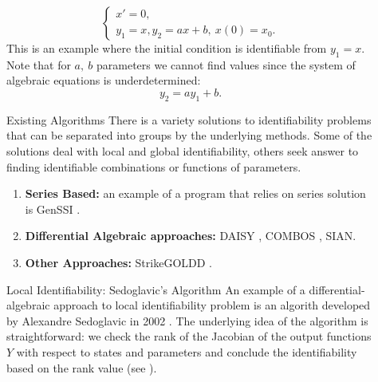 \documentclass[final]{beamer}
\newlength{\sepwidth}
\newlength{\colwidth}
\newcommand{\separatorcolumn}{\begin{column}{\sepwidth}\end{column}}
\begin{document}
\begin{frame}[t]
\begin{columns}[t]
\begin{column}{\colwidth}
    \end{column}

    \separatorcolumn

    \begin{column}{\colwidth}
      \begin{example}[3]
        \begin{equation}
          \begin{cases}
            x'=0, \\
            y_1=x, y_2=ax+b,~x(0)=x_0.
          \end{cases}
          \label{example3}
        \end{equation}
        This is an example where the initial condition is identifiable from \(y_1=x\). Note that for \(a,~b\) parameters we cannot find values since the system of algebraic equations is underdetermined: \[y_2=ay_1+b.\]
      \end{example}
      \begin{block}{Existing Algorithms}
        There is a variety solutions to identifiability problems that can be separated into groups by the underlying methods. Some of the solutions deal with local and global identifiability, others seek answer to finding identifiable combinations or functions of parameters.
        \begin{enumerate}
          \item \textbf{Series Based:} an example of a program that relies on series solution is GenSSI \cite{chics2011genssi}.
          \item \textbf{Differential Algebraic approaches:} DAISY \cite{saccomani2008daisy,saccomani2019new}, COMBOS \cite{meshkat2014finding,kalami2020combos2}, SIAN\cite{hong2019sian,hong2020global}.
          \item \textbf{Other Approaches:} StrikeGOLDD \cite{villaverde2016strikegoldd}.
        \end{enumerate}

      \end{block}

      \begin{block}{Local Identifiability: Sedoglavic's Algorithm \cite{sedoglavic2002probabilistic}}
        An example of a differential-algebraic approach to local identifiability problem is an algorith developed by Alexandre Sedoglavic in 2002 \cite{sedoglavic2002probabilistic}. The underlying idea of the algorithm is straightforward: we check the rank of the Jacobian of the output functions \(Y\) with respect to states and parameters and conclude the identifiability based on the rank value (see \cite[Corollary 2.1]{sedoglavic2002probabilistic}).


\end{block}
\end{column}
\end{columns}
\end{frame}
\end{document}
